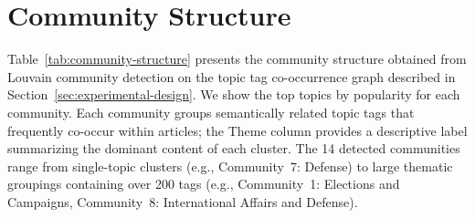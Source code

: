 \chapter{Community Structure}
\label{appendix:community-structure}

Table~\ref{tab:community-structure} presents the community structure obtained from Louvain community detection on the topic tag co-occurrence graph described in Section~\ref{sec:experimental-design}. We show the top topics by popularity for each community. Each community groups semantically related topic tags that frequently co-occur within articles; the Theme column provides a descriptive label summarizing the dominant content of each cluster. The 14 detected communities range from single-topic clusters (e.g., Community~7: Defense) to large thematic groupings containing over 200 tags (e.g., Community~1: Elections and Campaigns, Community~8: International Affairs and Defense).

